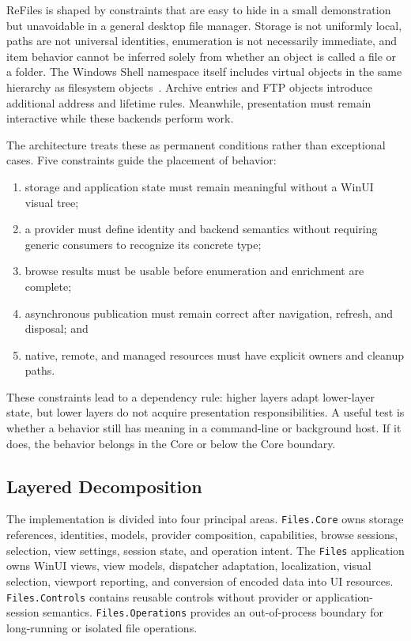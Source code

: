 \documentclass[10pt,a4paper,twoside]{article}
\begin{document}
ReFiles is shaped by constraints that are easy to hide in a small demonstration but unavoidable in a general
desktop file manager. Storage is not uniformly local, paths are not universal identities, enumeration is not
necessarily immediate, and item behavior cannot be inferred solely from whether an object is called a file or a
folder. The Windows Shell namespace itself includes virtual objects in the same hierarchy as filesystem
objects~\cite{windows-shell-namespace}. Archive entries and FTP objects introduce additional address and lifetime
rules. Meanwhile, presentation must remain interactive while these backends perform work.

The architecture treats these as permanent conditions rather than exceptional cases. Five constraints guide the
placement of behavior:

\begin{enumerate}[leftmargin=*]
  \item storage and application state must remain meaningful without a WinUI visual tree;
  \item a provider must define identity and backend semantics without requiring generic consumers to recognize
        its concrete type;
  \item browse results must be usable before enumeration and enrichment are complete;
  \item asynchronous publication must remain correct after navigation, refresh, and disposal; and
  \item native, remote, and managed resources must have explicit owners and cleanup paths.
\end{enumerate}

These constraints lead to a dependency rule: higher layers adapt lower-layer state, but lower layers do not
acquire presentation responsibilities. A useful test is whether a behavior still has meaning in a command-line
or background host. If it does, the behavior belongs in the Core or below the Core boundary.

\subsection{Layered Decomposition}

The implementation is divided into four principal areas. \texttt{Files.Core} owns storage references, identities,
models, provider composition, capabilities, browse sessions, selection, view settings, session state, and
operation intent. The \texttt{Files} application owns WinUI views, view models, dispatcher adaptation,
localization, visual selection, viewport reporting, and conversion of encoded data into UI resources.
\texttt{Files.Controls} contains reusable controls without provider or application-session semantics.
\texttt{Files.Operations} provides an out-of-process boundary for long-running or isolated file operations.
\end{document}
